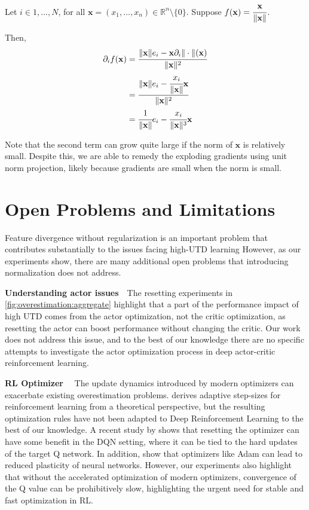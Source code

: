 Let $i \in {1, ..., N}$, for all $\mathbf{x} = (x_1, ..., x_n) \in \mathbb{R}^n \setminus \{0\}$. Suppose $f(\mathbf{x}) = \cfrac{\mathbf{x}}{\| \mathbf{x} \|}$. 

Then, 
\begin{align}
    \partial_i f(\mathbf{x}) 
    &= \cfrac{\| \mathbf{x} \| e_i - \mathbf{x} \partial_i \| \cdot \| (\mathbf{x}) }{\|\mathbf{x} \|^2} \\
    &= \cfrac{\| \mathbf{x} \| e_i - \cfrac{x_i}{\|\mathbf{x} \|} \mathbf{x}}{\|\mathbf{x} \|^2} \\
    &= \cfrac{1}{\|\mathbf{x} \|} e_i - \cfrac{x_i}{\|\mathbf{x} \|^3} \mathbf{x}
\end{align}

Note that the second term can grow quite large if the norm of $\mathbf{x}$ is relatively small. Despite this, we are able to remedy the exploding gradients using unit norm projection, likely because gradients are small when the norm is small.

\section{Open Problems and Limitations} \label{app:open}

Feature divergence without regularization is an important problem that contributes substantially to the issues facing high-UTD learning
However, as our experiments show, there are many additional open problems that introducing normalization does not address.

\textbf{Understanding actor issues}~~The resetting experiments in \autoref{fig:overestimation:aggregate} highlight that a part of the performance impact of high UTD comes from the actor optimization, not the critic optimization, as resetting the actor can boost performance without changing the critic.
Our work does not address this issue, and to the best of our knowledge there are no specific attempts to investigate the actor optimization process in deep actor-critic reinforcement learning.

{\bf RL Optimizer}~~ The update dynamics introduced by modern optimizers can exacerbate existing overestimation problems. 
\textcite{dabney2014adaptive} derives adaptive step-sizes for reinforcement learning from a theoretical perspective, but the resulting optimization rules have not been adapted to Deep Reinforcement Learning to the best of our knowledge.
A recent study by \textcite{asadi2023resetting} shows that resetting the optimizer can have some benefit in the DQN setting, where it can be tied to the hard updates of the target Q network.
In addition, \textcite{lyle2023understanding} show that optimizers like Adam can lead to reduced plasticity of neural networks.
However, our experiments also highlight that without the accelerated optimization of modern optimizers, convergence of the Q value can be prohibitively slow, highlighting the urgent need for stable and fast optimization in RL.

